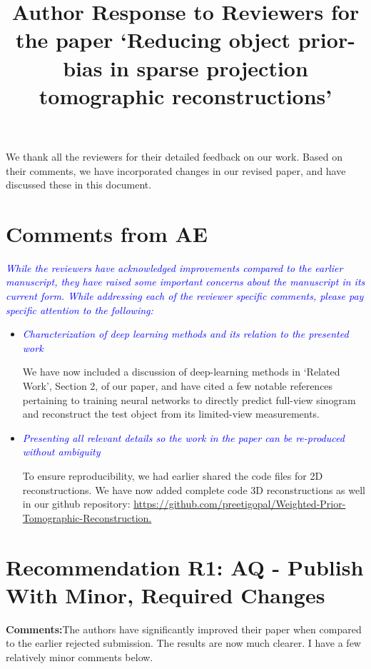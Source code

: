 \documentclass{article}
\title{Author Response to Reviewers for the paper `Reducing object prior-bias in sparse projection tomographic reconstructions'}
\begin{document}
\maketitle

We thank all the reviewers for their detailed feedback on our work. Based on their comments, we have incorporated changes in our revised paper, and have discussed these in this document.


\section{Comments from AE}

\textcolor{blue}{\textit{While the reviewers have acknowledged improvements compared to the earlier manuscript, they have raised some important concerns about the manuscript in its current form. While addressing each of the reviewer specific comments, please pay specific attention to the following:}}

  \begin{itemize}
  \item \textcolor{blue}{\textit{Characterization of deep learning methods and its relation to the presented work}}

    We have now included a discussion of deep-learning methods in `Related Work', Section 2, of our paper, and have cited a few notable references pertaining to training neural networks to directly predict full-view sinogram and reconstruct the test object from its limited-view measurements.

    \item\textcolor{blue}{\textit{Presenting all relevant details so the work in the paper can be re-produced without ambiguity}}
      

      To ensure reproducibility, we had earlier shared the code files for 2D reconstructions. We have now added complete code 3D reconstructions as well in our github repository: \url{https://github.com/preetigopal/Weighted-Prior-Tomographic-Reconstruction.}

  \end{itemize}

  \section{Recommendation R1: AQ - Publish With Minor, Required Changes}

  \textbf{Comments:}The authors have significantly improved their paper when compared to the earlier rejected submission. The results are now much clearer. I have a few relatively minor comments below.\\
\end{document}
